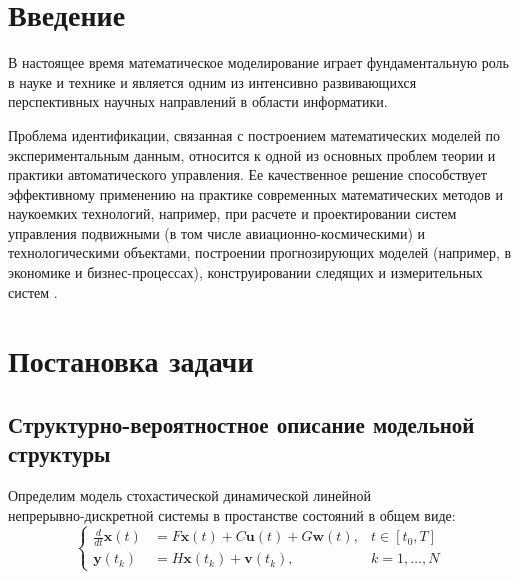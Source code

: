 \documentclass[a4paper,14pt]{extarticle}
\begin{document}
\tableofcontents

\newpage

\section*{Введение}

В настоящее время математическое моделирование играет фундаментальную роль в
науке и технике и является одним из интенсивно развивающихся перспективных
научных направлений в области информатики.

Проблема идентификации, связанная с построением математических моделей по
экспериментальным данным, относится к одной из основных проблем теории и
практики автоматического управления. Ее качественное решение способствует
эффективному применению на практике современных математических методов и
наукоемких технологий, например, при расчете и проектировании систем управления
подвижными (в том числе авиационно-космическими) и технологическими объектами,
построении прогнозирующих моделей (например, в экономике и бизнес-процессах),
конструировании следящих и измерительных систем \cite{denisov}.

\section{Постановка задачи}

\subsection[Структурно-вероятностное описание модельной структуры]
{Структурно-вероятностное описание модельной \\структуры}

\renewcommand{\vec}[1]{\mathbf{#1}}

Определим модель стохастической динамической линейной \\непрерывно-дискретной
системы в простанстве состояний в общем виде:
\begin{equation}
	\label{eq:initmod}
	\left\{ 
		\begin{array}{lll}
			\frac{d}{dt}\vec{x}(t) &= F \vec{x}(t) + C \vec{u}(t) + G
				\vec{w}(t), & t \in [t_0,T] \\ 
			\vec{y}(t_k)           &= H \vec{x}(t_k) + \vec{v}(t_k), 
				& k = 1,\ldots, N
		\end{array} 
	\right. 
\end{equation}
\end{document}

